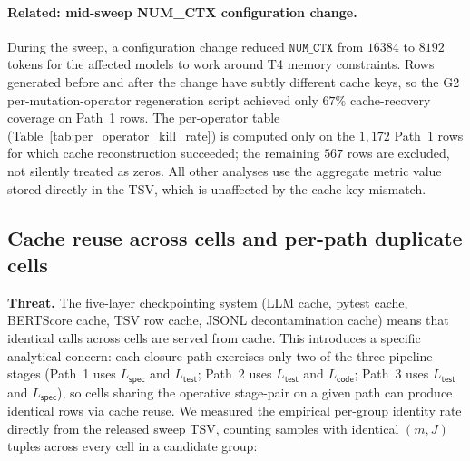 \paragraph{Related: mid-sweep NUM\_CTX configuration change.} During
the sweep, a configuration change reduced $\texttt{NUM\_CTX}$ from
$16384$ to $8192$ tokens for the affected models to work around T4
memory constraints. Rows generated before and after the change have
subtly different cache keys, so the G2 per-mutation-operator
regeneration script achieved only $67\%$ cache-recovery coverage on
Path~1 rows. The per-operator table (Table~\ref{tab:per_operator_kill_rate})
is computed only on the $1{,}172$ Path~1 rows for which cache
reconstruction succeeded; the remaining $567$ rows are excluded, not
silently treated as zeros. All other analyses use the aggregate
metric value stored directly in the TSV, which is unaffected by the
cache-key mismatch.

\subsection{Cache reuse across cells and per-path duplicate cells}
\label{sec:appendix_cache_reuse}

\textbf{Threat.} The five-layer checkpointing system (LLM cache,
pytest cache, BERTScore cache, TSV row cache, JSONL decontamination
cache) means that identical calls across cells are served from cache.
This introduces a specific analytical concern: each closure path
exercises only two of the three pipeline stages (Path~1 uses
$L_{\textsf{spec}}$ and $L_{\textsf{test}}$; Path~2 uses
$L_{\textsf{test}}$ and $L_{\textsf{code}}$; Path~3 uses
$L_{\textsf{test}}$ and $L_{\textsf{spec}}$), so cells sharing the
operative stage-pair on a given path can produce identical rows via
cache reuse. We measured the empirical per-group identity rate
directly from the released sweep TSV, counting samples with identical
$(m, J)$ tuples across every cell in a candidate group:


